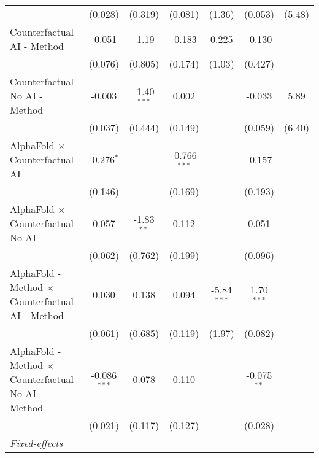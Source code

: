\begin{tabular}{lcccccc}
                                                              & (0.028)        & (0.319)       & (0.081)        & (1.36)        & (0.053)       & (5.48)\\   
   Counterfactual AI - Method                                 & -0.051         & -1.19         & -0.183         & 0.225         & -0.130        &   \\   
                                                              & (0.076)        & (0.805)       & (0.174)        & (1.03)        & (0.427)       &   \\   
   Counterfactual No AI - Method                              & -0.003         & -1.40$^{***}$ & 0.002          &               & -0.033        & 5.89\\   
                                                              & (0.037)        & (0.444)       & (0.149)        &               & (0.059)       & (6.40)\\   
   AlphaFold $\times$ Counterfactual AI                       & -0.276$^{*}$   &               & -0.766$^{***}$ &               & -0.157        &   \\   
                                                              & (0.146)        &               & (0.169)        &               & (0.193)       &   \\   
   AlphaFold $\times$ Counterfactual No AI                    & 0.057          & -1.83$^{**}$  & 0.112          &               & 0.051         &   \\   
                                                              & (0.062)        & (0.762)       & (0.199)        &               & (0.096)       &   \\   
   AlphaFold - Method $\times$ Counterfactual AI - Method     & 0.030          & 0.138         & 0.094          & -5.84$^{***}$ & 1.70$^{***}$  &   \\   
                                                              & (0.061)        & (0.685)       & (0.119)        & (1.97)        & (0.082)       &   \\   
   AlphaFold - Method $\times$ Counterfactual No AI - Method  & -0.086$^{***}$ & 0.078         & 0.110          &               & -0.075$^{**}$ &   \\   
                                                              & (0.021)        & (0.117)       & (0.127)        &               & (0.028)       &   \\   
   \midrule
   \emph{Fixed-effects}\\

\end{tabular}
